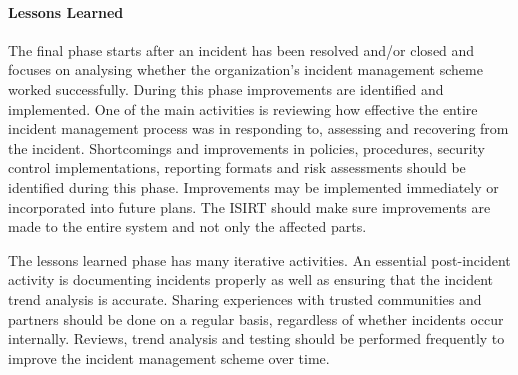 \paragraph{Lessons Learned} The final phase starts after an incident has been resolved and/or closed and focuses on analysing whether the organization's incident management scheme worked successfully. During this phase improvements are identified and implemented. One of the main activities is reviewing how effective the entire incident management process was in responding to, assessing and recovering from the incident. Shortcomings and improvements in policies, procedures, security control implementations, reporting formats and risk assessments should be identified during this phase. Improvements may be implemented immediately or incorporated into future plans. The \ac{ISIRT} should make sure improvements are made to the entire system and not only the affected parts.

The lessons learned phase has many iterative activities. An essential post-incident activity is documenting incidents properly as well as ensuring that the incident trend analysis is accurate. Sharing experiences with trusted communities and partners should be done on a regular basis, regardless of whether incidents occur internally. Reviews, trend analysis and testing should be performed frequently to improve the incident management scheme over time. 




